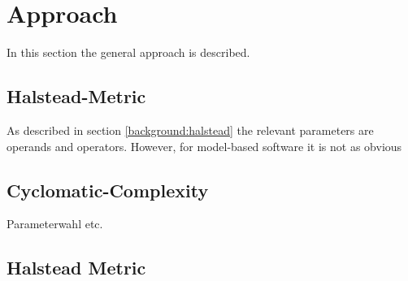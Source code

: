 \section{Approach}

In this section the general approach is described.

\subsection{Halstead-Metric} \label{sec:background:halstead}

As described in section \autoref{background:halstead} the relevant parameters are operands and operators.
However, for model-based software it is not as obvious

\subsection{Cyclomatic-Complexity}

Parameterwahl etc.

\subsection{Halstead Metric} 